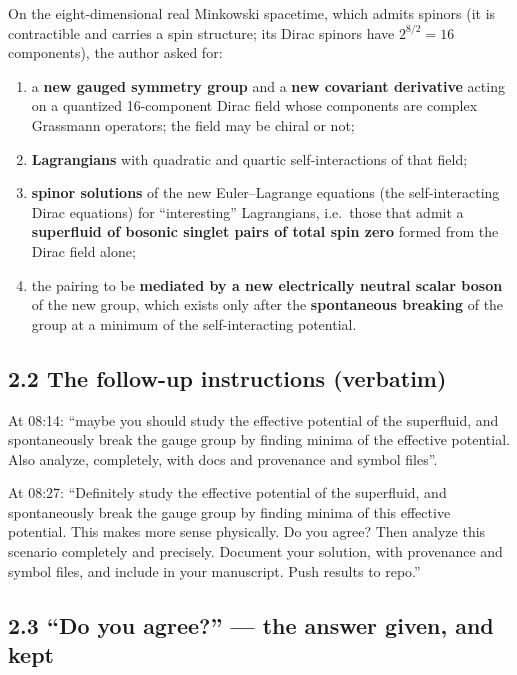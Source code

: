 \documentclass[
  10pt,
]{article}
\providecommand{\tightlist}{%
  \setlength{\itemsep}{0pt}\setlength{\parskip}{0pt}}
\begin{document}
On the eight-dimensional real Minkowski spacetime, which admits spinors
(it is contractible and carries a spin structure; its Dirac spinors have
\(2^{8/2}=16\) components), the author asked for:

\begin{enumerate}
\def\labelenumi{\arabic{enumi}.}
\tightlist
\item
  a \textbf{new gauged symmetry group} and a \textbf{new covariant
  derivative} acting on a quantized 16-component Dirac field whose
  components are complex Grassmann operators; the field may be chiral or
  not;
\item
  \textbf{Lagrangians} with quadratic and quartic self-interactions of
  that field;
\item
  \textbf{spinor solutions} of the new Euler--Lagrange equations (the
  self-interacting Dirac equations) for ``interesting'' Lagrangians,
  i.e.~those that admit a \textbf{superfluid of bosonic singlet pairs of
  total spin zero} formed from the Dirac field alone;
\item
  the pairing to be \textbf{mediated by a new electrically neutral
  scalar boson} of the new group, which exists only after the
  \textbf{spontaneous breaking} of the group at a minimum of the
  self-interacting potential.
\end{enumerate}

\hypertarget{the-follow-up-instructions-verbatim}{%
\subsection{2.2 The follow-up instructions
(verbatim)}\label{the-follow-up-instructions-verbatim}}

At 08:14: ``maybe you should study the effective potential of the
superfluid, and spontaneously break the gauge group by finding minima of
the effective potential. Also analyze, completely, with docs and
provenance and symbol files''.

At 08:27: ``Definitely study the effective potential of the superfluid,
and spontaneously break the gauge group by finding minima of this
effective potential. This makes more sense physically. Do you agree?
Then analyze this scenario completely and precisely. Document your
solution, with provenance and symbol files, and include in your
manuscript. Push results to repo.''

\hypertarget{do-you-agree-the-answer-given-and-kept}{%
\subsection{2.3 ``Do you agree?'' --- the answer given, and
kept}\label{do-you-agree-the-answer-given-and-kept}}
\end{document}
